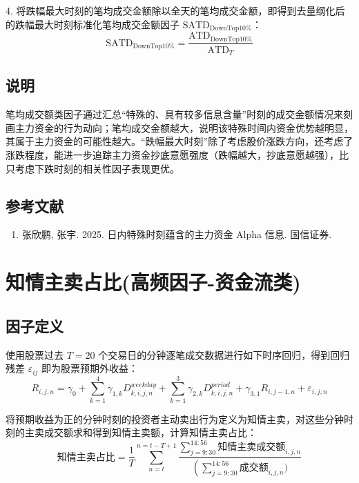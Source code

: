 \documentclass{article}
\begin{document}
4. 将跌幅最大时刻的笔均成交金额除以全天的笔均成交金额，即得到去量纲化后的跌幅最大时刻标准化笔均成交金额因子 \( \mathrm{SATD}_{\mathrm{DownTop10\%}} \)：
\begin{equation}
    \mathrm{SATD}_{\mathrm{DownTop10\%}} = \frac{\mathrm{ATD}_{\mathrm{DownTop10\%}}}{\mathrm{ATD}_T}
\end{equation}

\subsection{说明}
笔均成交额类因子通过汇总“特殊的、具有较多信息含量”时刻的成交金额情况来刻画主力资金的行为动向；笔均成交金额越大，说明该特殊时间内资金优势越明显，其属于主力资金的可能性越大。“跌幅最大时刻”除了考虑股价涨跌方向，还考虑了涨跌程度，能进一步追踪主力资金抄底意愿强度（跌幅越大，抄底意愿越强），比只考虑下跌时刻的相关性因子表现更优。

\subsection{参考文献}
\begin{enumerate}
    \item 张欣鹏, 张宇. 2025. 日内特殊时刻蕴含的主力资金 Alpha 信息. 国信证券.
\end{enumerate}

\section{知情主卖占比(高频因子-资金流类)}

\subsection{因子定义}
使用股票过去 \( T=20 \) 个交易日的分钟逐笔成交数据进行如下时序回归，得到回归残差 \(\varepsilon_{ij}\) 即为股票预期外收益：
\begin{equation}
    R_{i,j,n} = \gamma_0 + \sum_{k=1}^4 \gamma_{1,k} D_{k,i,j,n}^{weekday} + \sum_{k=1}^3 \gamma_{2,k} D_{k,i,j,n}^{period} + \gamma_{3,1} R_{i,j-1,n} + \varepsilon_{i,j,n}
\end{equation}

将预期收益为正的分钟时刻的投资者主动卖出行为定义为知情主卖，对这些分钟时刻的主卖成交额求和得到知情主卖额，计算知情主卖占比：
\begin{equation}
    \text{知情主卖占比} = \frac{1}{T} \sum_{n=t}^{n=t-T+1} \frac { \sum_{j=9:30}^{14:56} \text{知情主卖成交额}_{i,j,n} } {\left( \sum_{j=9:30}^{14:56} \text{成交额}_{i,j,n} )}
\end{equation}
\end{document}
